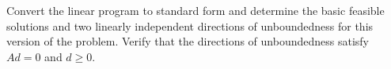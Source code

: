 Convert the linear program to standard form and determine the basic feasible solutions and two linearly independent
directions of unboundedness for this version of the problem. Verify that the directions of unboundedness satisfy 
$Ad = 0$ and $d \ge 0$.

\begin{solution}
  \ \\
  \vfill
  \pagebreak
  \ \\
  \vfill
\end{solution}